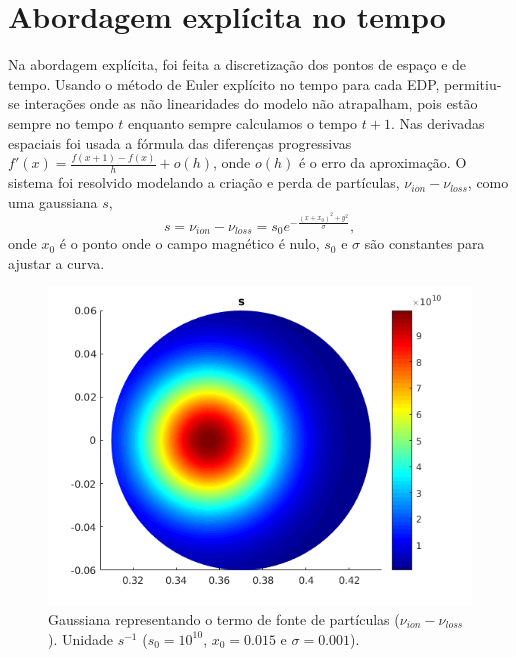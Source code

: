 \documentclass[12pt,oneside,a4paper]{abntex2}
\begin{document}
\section{Abordagem explícita no tempo}

Na abordagem explícita, foi feita a discretização dos pontos de espaço e de tempo. Usando o método de Euler explícito no tempo para cada EDP, permitiu-se interações onde as não linearidades do modelo não atrapalham, pois estão sempre no tempo $t$ enquanto sempre calculamos o tempo $t+1$. Nas derivadas espaciais foi usada a fórmula das diferenças progressivas $f'(x)=\frac{f(x+1)-f(x)}{h}+o(h)$, onde $o(h)$ é o erro da aproximação.
O sistema foi resolvido modelando a criação e perda de partículas, $\nu_{ion} - \nu_{loss}$, como uma gaussiana $s$,
\begin{equation}
\label{gaussiana}
s = \nu_{ion} - \nu_{loss} = s_0 e^{-\frac{ (x+x_0)^2+y^2 }{\sigma}} ,
\end{equation}
onde $x_0$ é o ponto onde o campo magnético é nulo, $s_0$ e $\sigma$ são constantes para ajustar a curva.
\begin{figure}[H]
\centering
\includegraphics[scale=1]{../SImulacao_breakdown/PDE/sB.png} 
\caption{Gaussiana representando o termo de fonte de partículas ($\nu_{ion} - \nu_{loss}$). Unidade $s^{-1}$ ($s_0=10^{10}$, $x_0=0.015$ e $\sigma=0.001$).}
\label{grafgaussiana}
\end{figure}
\end{document}
